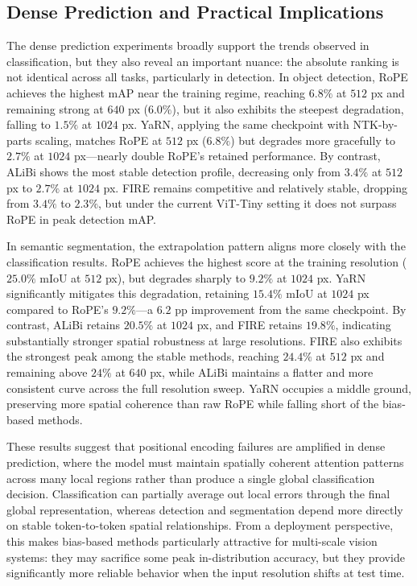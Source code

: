 \subsection{Dense Prediction and Practical Implications}

The dense prediction experiments broadly support the trends observed in classification, but they
also reveal an important nuance: the absolute ranking is not identical across all tasks,
particularly in detection. In object detection, RoPE achieves the highest mAP near the training
regime, reaching $6.8\%$ at $512$ px and remaining strong at $640$ px ($6.0\%$), but it also
exhibits the steepest degradation, falling to $1.5\%$ at $1024$ px. YaRN, applying the same
checkpoint with NTK-by-parts scaling, matches RoPE at $512$ px ($6.8\%$) but degrades more
gracefully to $2.7\%$ at $1024$ px---nearly double RoPE's retained performance. By contrast, ALiBi shows the
most stable detection profile, decreasing only from $3.4\%$ at $512$ px to $2.7\%$ at $1024$ px.
FIRE remains competitive and relatively stable, dropping from $3.4\%$ to $2.3\%$, but under the
current ViT-Tiny setting it does not surpass RoPE in peak detection mAP.

In semantic segmentation, the extrapolation pattern aligns more closely with the classification
results. RoPE achieves the highest score at the training resolution ($25.0\%$ mIoU at $512$ px),
but degrades sharply to $9.2\%$ at $1024$ px. YaRN significantly mitigates this degradation,
retaining $15.4\%$ mIoU at $1024$ px compared to RoPE's $9.2\%$---a $6.2$ pp improvement
from the same checkpoint. By contrast, ALiBi retains $20.5\%$ at $1024$ px,
and FIRE retains $19.8\%$, indicating substantially stronger spatial robustness at large
resolutions. FIRE also exhibits the strongest peak among the stable methods, reaching
$24.4\%$ at $512$ px and remaining above $24\%$ at $640$ px, while ALiBi maintains a flatter and
more consistent curve across the full resolution sweep. YaRN occupies a middle ground,
preserving more spatial coherence than raw RoPE while falling short of the bias-based methods.

These results suggest that positional encoding failures are amplified in dense prediction, where
the model must maintain spatially coherent attention patterns across many local regions rather than
produce a single global classification decision. Classification can partially average out local
errors through the final global representation, whereas detection and segmentation depend more
directly on stable token-to-token spatial relationships. From a deployment perspective, this makes
bias-based methods particularly attractive for multi-scale vision systems: they may sacrifice some
peak in-distribution accuracy, but they provide significantly more reliable behavior when the input
resolution shifts at test time.

